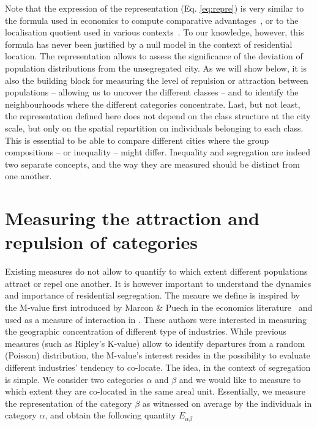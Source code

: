 Note that the expression of the representation (Eq. \ref{eq:repre}) is very
similar to the formula used in economics to compute comparative
advantages~\cite{Balassa:1965}, or to the localisation quotient used in various
contexts~\cite{Apparicio:2000, Schwabe:2011}. To our knowledge, however, this
formula has never been justified by a null model in the context of residential
location. The representation allows to assess the significance of the deviation
of population distributions from the unsegregated city. As we will show below,
it is also the building block for measuring the level of repulsion or attraction
between populations -- allowing us to uncover the different classes -- and to
identify the neighbourhoods where the different categories concentrate. Last,
but not least, the representation defined here does not depend on the class
structure at the city scale, but only on the spatial repartition on individuals
belonging to each class. This is essential to be able to compare different
cities where the group compositions -- or inequality -- might differ. Inequality
and segregation are indeed two separate concepts, and the way they are measured should
be distinct from one another. 

\section{Measuring the attraction and repulsion of categories}
\label{sec:measuring_the_attraction_and_repulsion_of_categories}

Existing measures do not allow to quantify to which extent different populations
attract or repel one another. It is however important to understand the dynamics
and importance of residential segregation. The meaure we define is inspired by
the M-value first introduced by Marcon \& Puech in the economics
literature~\cite{Marcon:2009} and used as a measure of interaction in
\cite{Jensen:2006}.  These authors were interested in measuring the geographic
concentration of different type of  industries. While previous measures (such as
Ripley's K-value) allow to identify departures from a random (Poisson)
distribution, the M-value's interest resides in the possibility to evaluate
different industries' tendency to co-locate. The idea, in the context of
segregation is simple. We consider two categories $\alpha$ and $\beta$ and we
would like to measure to which extent they are co-located in the same areal
unit. Essentially, we measure the representation of the category $\beta$ as
witnessed on average by the individuals in category $\alpha$, and obtain the following quantity $E_{\alpha\beta}$


